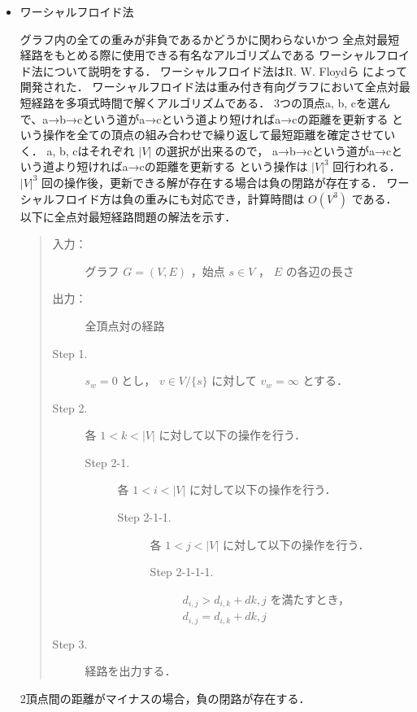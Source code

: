 \documentclass[12pt]{optlab-bachelor}
\begin{document}
\begin{itemize}
  \item ワーシャルフロイド法

  グラフ内の全ての重みが非負であるかどうかに関わらないかつ
  全点対最短経路をもとめる際に使用できる有名なアルゴリズムである
  ワーシャルフロイド法について説明をする．
  ワーシャルフロイド法はR. W. Floydら \cite{Floyd}によって開発された．
  ワーシャルフロイド法は重み付き有向グラフにおいて全点対最短経路を多項式時間で解くアルゴリズムである．
  3つの頂点a, b, cを選んで、a→b→cという道がa→cという道より短ければa→cの距離を更新する
  という操作を全ての頂点の組み合わせで繰り返して最短距離を確定させていく．
  a, b, cはそれぞれ $|V|$ の選択が出来るので，
  a→b→cという道がa→cという道より短ければa→cの距離を更新する
  という操作は $|V|^3$ 回行われる．
  $|V|^3$ 回の操作後，更新できる解が存在する場合は負の閉路が存在する．
  ワーシャルフロイド方は負の重みにも対応でき，計算時間は $O(V^3)$ である．
  以下に全点対最短経路問題の解法を示す．

  \begin{quote}
    \begin{description}
      \item[入力：] グラフ $G=(V,E)$ ，始点 $s \in V$ ， $E$ の各辺の長さ
      \item[出力：] 全頂点対の経路
      \item[Step 1.] $s_w = 0$ とし， $v \in V/\{s\}$ に対して $v_w = \infty$ とする．
      \item[Step 2.] 各 $1<k<|V|$ に対して以下の操作を行う．
      \begin{description}
        \item[Step 2-1.] 各 $1<i<|V|$ に対して以下の操作を行う．
        \begin{description}
          \item[Step 2-1-1.] 各 $1<j<|V|$ に対して以下の操作を行う．
          \begin{description}
            \item[Step 2-1-1-1.] $d_{i,j} > d_{i,k} + d{k,j}$ を満たすとき，
            $d_{i,j} = d_{i,k} + d{k,j}$
          \end{description}
        \end{description}
      \end{description}

      \item[Step 3.] 経路を出力する．
    \end{description}
  \end{quote}
  2頂点間の距離がマイナスの場合，負の閉路が存在する．
\end{itemize}
\end{document}
